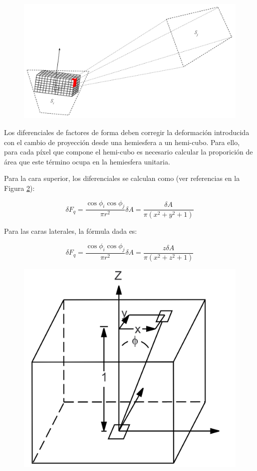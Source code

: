 \vspace{5mm}
\begin{figure}[!ht]
	\centering
	\includegraphics[width=0.8\linewidth]{assets/Hemicube}
	\label{img:ff}
\end{figure}

Los diferenciales de factores de forma deben corregir la deformación introducida con el cambio de proyección desde una hemiesfera a un hemi-cubo. Para ello, para cada píxel que compone el hemi-cubo es necesario calcular la proporición de área que este término ocupa en la hemiesfera unitaria.

Para la cara superior, los diferenciales se calculan como (ver referencias en la Figura \ref{img:deltaff}):

\begin{equation}
	\delta{F_{q}} = \frac{\cos{\phi_{i}}\cos{\phi_{j}}}{\pi{r^{2}}} \delta{A} = \frac{\delta{A}}{\pi({x^{2} + y^{2} + 1})} 
\end{equation}

Para las caras laterales, la fórmula dada es:

\begin{equation}
\delta{F_{q}} = \frac{\cos{\phi_{i}}\cos{\phi_{j}}}{\pi{r^{2}}}\delta{A} = \frac{z\delta{A}}{\pi({x^{2} + z^{2} + 1})}
\end{equation}

\begin{figure}[H]
	\centering
	\includegraphics[width=0.4\linewidth]{assets/deltaff}
	\label{img:deltaff}
\end{figure}


